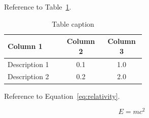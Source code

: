 Reference to Table~\ref{tab:table}.

\begin{table}[hbt!]
  \centering
  \renewcommand{\arraystretch}{1.1}
  \caption{Table caption}
  \begin{tabular}{p{0.3\linewidth}c{0.12\linewidth}c{0.12\linewidth}}
   \toprule
   \textbf{Column 1} & \textbf{Column 2} & \textbf{Column 3} \\
   \midrule
   Description 1 & 0.1 & 1.0 \\
   Description 2 & 0.2 & 2.0 \\
  \bottomrule
  \end{tabular}\label{tab:table}
  \renewcommand{\arraystretch}{1}
\end{table}

Reference to Equation~\ref{eq:relativity}.

\begin{equation}
\label{eq:relativity}
   E = mc^{2}
\end{equation}
